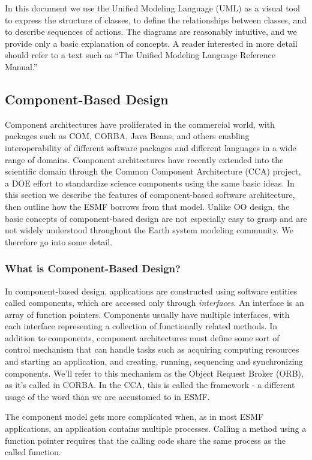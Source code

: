 In this document we use the Unified Modeling Language (UML) as a visual tool 
to express the structure of 
classes, to define the relationships between classes, and to describe sequences
of actions.  The diagrams are reasonably intuitive, and we provide 
only a basic explanation of concepts.  A reader interested in more detail should 
refer to a text such as ``The Unified Modeling Language Reference Manual.''

\subsection{Component-Based Design}

Component architectures have proliferated in the commercial world, with
packages such as COM, CORBA, Java Beans, and others enabling interoperability
of different software packages and different languages in a wide range
of domains.  Component architectures have recently extended into the 
scientific domain through the Common Component Architecture (CCA) project, a 
DOE effort to standardize science components using the same basic ideas.
In this section we describe the features of component-based software 
architecture, then outline how the ESMF borrows from that model.  Unlike
OO design, the basic concepts of component-based design are not especially
easy to grasp and are not widely understood throughout the Earth system 
modeling community.  We therefore go into some detail.

\subsubsection{What is Component-Based Design?}

In component-based design, applications are constructed using software entities 
called components, which are accessed only through {\it interfaces}.  
An interface is an array of function pointers.  Components usually have multiple 
interfaces, with each interface representing a collection of functionally 
related methods.  In addition to components, component 
architectures must define some sort of control mechanism that can handle tasks 
such as acquiring computing resources and starting an application, 
and creating, running, sequencing and synchronizing components.  We'll refer to
this mechanism as the Object Request Broker (ORB), as it's called in CORBA.  In the 
CCA, this is called the framework - a different usage
of the word than we are accustomed to in ESMF.

The component model gets more complicated when, as in most ESMF applications, 
an application contains multiple processes.  Calling a 
method using a function pointer requires that the calling code share the 
same process as the called function.  

